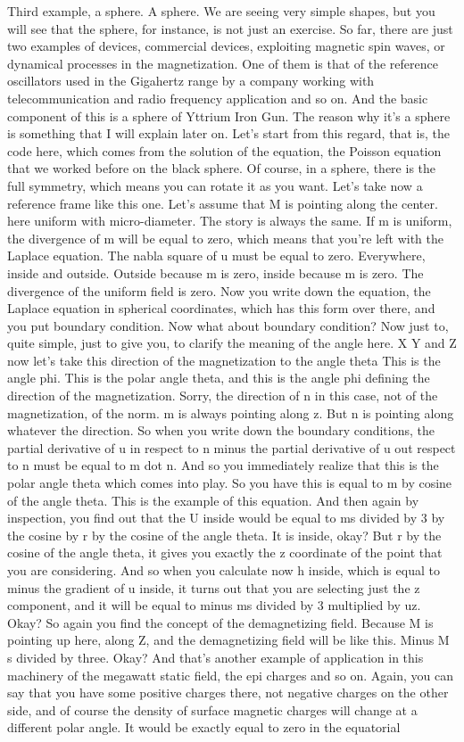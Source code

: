 Third example, a sphere. A sphere. We are seeing very simple shapes, but you will see that the sphere, for instance, is not just an exercise. So far, there are just two examples of devices, commercial devices, exploiting magnetic spin waves, or dynamical processes in the magnetization. One of them is that of the reference oscillators used in the Gigahertz range by a company working with telecommunication and radio frequency application and so on. And the basic component of this is a sphere of Yttrium Iron Gun. The reason why it's a sphere is something that I will explain later on. Let's start from this regard, that is, the code here, which comes from the solution of the equation, the Poisson equation that we worked before on the black sphere. Of course, in a sphere, there is the full symmetry, which means you can rotate it as you want. Let's take now a reference frame like this one. Let's assume that M is pointing along the center. here uniform with micro-diameter. The story is always the same. If m is uniform, the divergence of m will be equal to zero, which means that you're left with the Laplace equation. The nabla square of u must be equal to zero. Everywhere, inside and outside. Outside because m is zero, inside because m is zero. The divergence of the uniform field is zero. Now you write down the equation, the Laplace equation in spherical coordinates, which has this form over there, and you put boundary condition. Now what about boundary condition? Now just to, quite simple, just to give you, to clarify the meaning of the angle here. X Y and Z now let's take this direction of the magnetization to the angle theta This is the angle phi. This is the polar angle theta, and this is the angle phi defining the direction of the magnetization. Sorry, the direction of n in this case, not of the magnetization, of the norm. m is always pointing along z. But n is pointing along whatever the direction. So when you write down the boundary conditions, the partial derivative of u in respect to n minus the partial derivative of u out respect to n must be equal to m dot n. And so you immediately realize that this is the polar angle theta which comes into play. So you have this is equal to m by cosine of the angle theta. This is the example of this equation. And then again by inspection, you find out that the U inside would be equal to ms divided by 3 by the cosine by r by the cosine of the angle theta. It is inside, okay? But r by the cosine of the angle theta, it gives you exactly the z coordinate of the point that you are considering. And so when you calculate now h inside, which is equal to minus the gradient of u inside, it turns out that you are selecting just the z component, and it will be equal to minus ms divided by 3 multiplied by uz. Okay? So again you find the concept of the demagnetizing field. Because M is pointing up here, along Z, and the demagnetizing field will be like this. Minus M s divided by three. Okay? And that's another example of application in this machinery of the megawatt static field, the epi charges and so on. Again, you can say that you have some positive charges there, not negative charges on the other side, and of course the density of surface magnetic charges will change at a different polar angle. It would be exactly equal to zero in the equatorial 